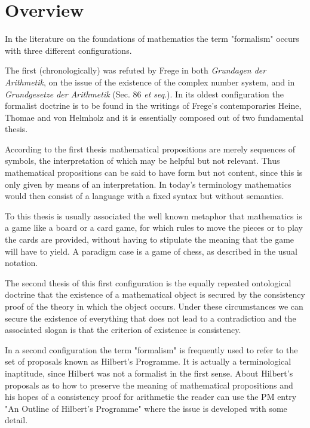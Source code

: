 \documentclass[12pt]{article}
\begin{document}
\tableofcontents

\section{Overview}\normalsize

In the literature on the foundations of mathematics the term "formalism" occurs with three different configurations.

The first (chronologically) was refuted by Frege in both \emph{Grundagen der Arithmetik}, on the issue of the existence of the complex number system, and in \emph{Grundgesetze der  Arithmetik} (Sec. 86 \emph{et seq}.). In its oldest configuration the formalist doctrine is to be found in the writings of Frege's contemporaries Heine, Thomae and von Helmholz and it is essentially composed out of two fundamental thesis.
 
According to the first thesis mathematical propositions are merely sequences of symbols, the interpretation of which may be helpful but not relevant. Thus mathematical propositions can be said to have form but not content, since this is only given by means of an interpretation. In today's terminology mathematics would then consist of a language with a fixed syntax but without semantics.

To this thesis is usually associated the well known metaphor that mathematics is a game like a board or a card game, for which rules to move the pieces or to play the cards are provided, without having to stipulate the meaning that the game will have to yield. A paradigm case is a game of chess, as described in the usual notation.

The second thesis of this first configuration is the equally repeated ontological doctrine that the existence of a  mathematical object is secured by the consistency proof of the theory in which the object occurs. Under these circumstances we can secure the existence of everything that does not lead to a contradiction and the associated slogan is that the criterion of existence is consistency.

In a second configuration the term "formalism" is frequently used to refer to the set of proposals known as Hilbert's  Programme. It is actually a terminological inaptitude, since Hilbert was not a formalist in the first sense. About Hilbert's proposals as to how to preserve the meaning of mathematical propositions and his hopes of a consistency proof for arithmetic the reader can use the PM entry "An Outline of Hilbert's Programme" where the issue is developed with some detail.
\end{document}
